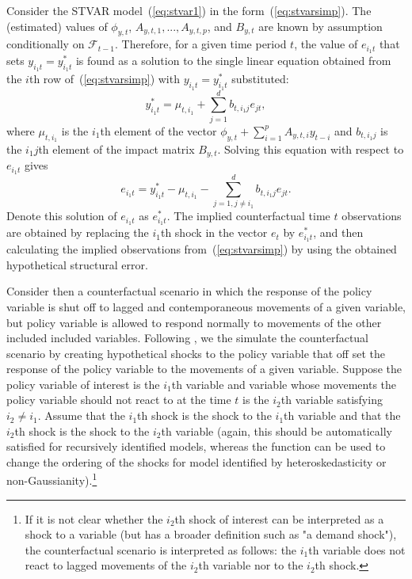 \documentclass[nojss]{jss}
\begin{document}
Consider the STVAR model~(\ref{eq:stvar1}) in the form~(\ref{eq:stvarsimp}). The (estimated) values of $\phi_{y,t}$, $A_{y,t,1},...,A_{y,t,p}$, and $B_{y,t}$ are known by assumption conditionally on $\mathcal{F}_{t-1}$. Therefore, for a given time period $t$, the value of $e_{i_1t}$ that sets $y_{i_1t}=y_{i_1t}^{*}$ is found as a solution to the single linear equation obtained from the $i$th row of~(\ref{eq:stvarsimp}) with $y_{i_1t}=y_{i_1t}^{*}$ substituted:
\begin{equation}
 y_{i_1t}^{*} = \mu_{t,i_1} + \sum_{j=1}^d b_{t,i_1j} e_{jt},
\end{equation}
where $\mu_{t,i_1}$ is the $i_1$th element of the vector $\phi_{y,t} + \sum_{i=1}^pA_{y,t,i}y_{t-i}$ and $b_{t,i_1j}$ is the $i_1j$th element of the impact matrix $B_{y,t}$. Solving this equation with respect to $e_{i_1t}$ gives
\begin{equation}\label{eq:val_e_t}
e_{i_1t} = y_{i_1t}^{*} - \mu_{t,i_1} - \sum_{j=1, j\neq i_1}^d b_{t,i_1j} e_{jt}.
\end{equation}
Denote this solution of $e_{i_1t}$ as $e_{i_1t}^{*}$. The implied counterfactual time $t$ observations are obtained by replacing the $i_1$th shock in the vector $e_t$ by $e_{i_1t}^{*}$, and then calculating the implied observations from~(\ref{eq:stvarsimp}) by using the obtained hypothetical structural error.

Consider then a counterfactual scenario in which the response of the policy variable is shut off to lagged and contemporaneous movements of a given variable, but policy variable is allowed to respond normally to movements of the other included included variables. Following \cite{Kilian+Lewis:2011}, we the simulate the counterfactual scenario by creating hypothetical shocks to the policy variable that off set the response of the policy variable to the movements of a given variable. Suppose the policy variable of interest is the $i_1$th variable and variable whose movements the policy variable should not react to at the time $t$ is the $i_2$th variable satisfying $i_2\neq i_1$. Assume that the $i_1$th shock is the shock to the $i_1$th variable and that the $i_2$th shock is the shock to the $i_2$th variable (again, this should be automatically satisfied for recursively identified models, whereas the function  can be used to change the ordering of the shocks for model identified by heteroskedasticity or non-Gaussianity).\footnote{If it is not clear whether the $i_2$th shock of interest can be interpreted as a shock to a variable (but has a broader definition such as "a demand shock"), the counterfactual scenario is interpreted as follows: the $i_1$th variable does not react to lagged movements of the $i_2$th variable nor to the $i_2$th shock.}
\end{document}
